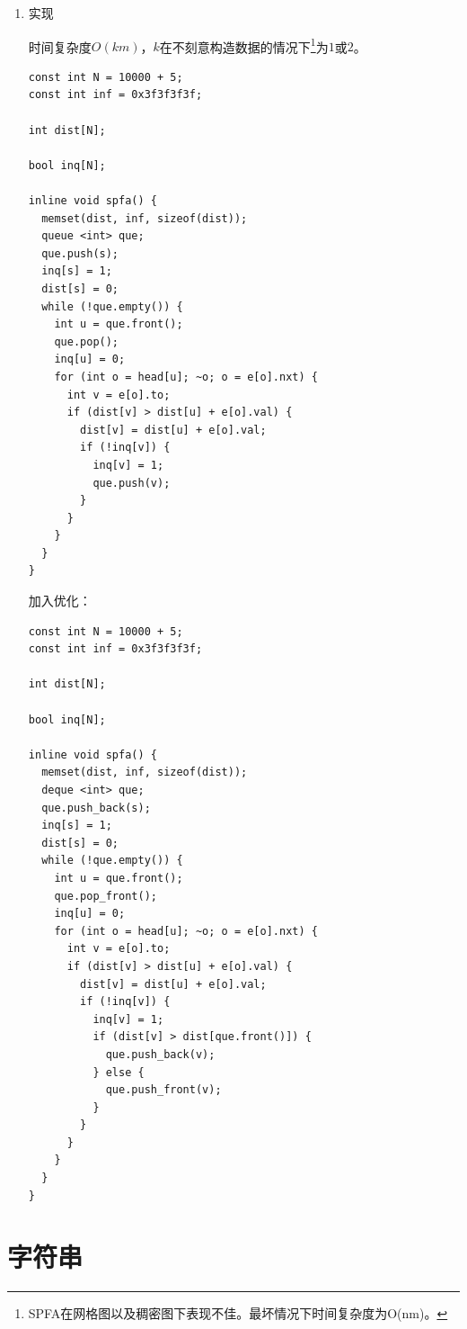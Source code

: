 \documentclass[11pt]{article}
\begin{document}
\begin{enumerate}
\begin{enumerate}
\item SLF
\label{sec:org8c18558}

\(Small\ Label\ First\) 策略：设要加入的节点为\(j\)，队首节点为\(i\)，如果满足\(dist_j < dist_i\)，则将其插入到队首，否则插入到队尾。
\end{enumerate}

\item 实现
\label{sec:orgb24cac0}

时间复杂度\(O(km)\)，\(k\)在不刻意构造数据的情况下\footnote{SPFA在网格图以及稠密图下表现不佳。最坏情况下时间复杂度为O(nm)。}为\(1\)或\(2\)。

\begin{verbatim}
const int N = 10000 + 5;
const int inf = 0x3f3f3f3f;

int dist[N];

bool inq[N];

inline void spfa() {
  memset(dist, inf, sizeof(dist));
  queue <int> que;
  que.push(s);
  inq[s] = 1;
  dist[s] = 0;
  while (!que.empty()) {
    int u = que.front();
    que.pop();
    inq[u] = 0;
    for (int o = head[u]; ~o; o = e[o].nxt) {
      int v = e[o].to;
      if (dist[v] > dist[u] + e[o].val) {
        dist[v] = dist[u] + e[o].val;
        if (!inq[v]) {
          inq[v] = 1;
          que.push(v);
        }
      }
    }
  }
}
\end{verbatim}

加入优化：

\begin{verbatim}
const int N = 10000 + 5;
const int inf = 0x3f3f3f3f;

int dist[N];

bool inq[N];

inline void spfa() {
  memset(dist, inf, sizeof(dist));
  deque <int> que;
  que.push_back(s);
  inq[s] = 1;
  dist[s] = 0;
  while (!que.empty()) {
    int u = que.front();
    que.pop_front();
    inq[u] = 0;
    for (int o = head[u]; ~o; o = e[o].nxt) {
      int v = e[o].to;
      if (dist[v] > dist[u] + e[o].val) {
        dist[v] = dist[u] + e[o].val;
        if (!inq[v]) {
          inq[v] = 1;
          if (dist[v] > dist[que.front()]) {
            que.push_back(v);
          } else {
            que.push_front(v);
          }
        }
      }
    }
  }
}
\end{verbatim}
\end{enumerate}

\section{字符串}
\label{sec:orgb4323f6}
\end{document}
